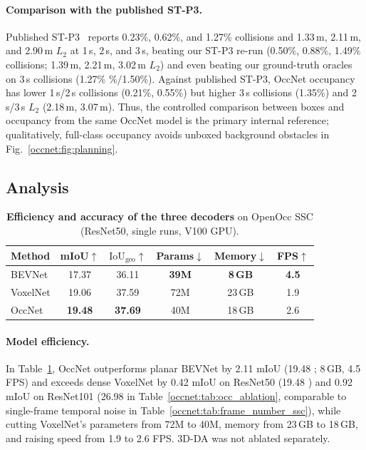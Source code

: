 \paragraph{Comparison with the published ST-P3.} Published ST-P3~\cite{hu2022stp3} reports 0.23\%, 0.62\%, and 1.27\% collisions and 1.33\,m, 2.11\,m, and 2.90\,m $L_2$ at 1\,s, 2\,s, and 3\,s, beating our ST-P3 re-run (0.50\%, 0.88\%, 1.49\% collisions; 1.39\,m, 2.21\,m, 3.02\,m $L_2$) and even beating our ground-truth oracles on 3\,s collisions (1.27\% \%/1.50\%). Against published ST-P3, OccNet occupancy has lower 1\,s/2\,s collisions (0.21\%, 0.55\%) but higher 3\,s collisions (1.35\%) and 2\,s/3\,s $L_2$ (2.18\,m, 3.07\,m). Thus, the controlled comparison between boxes and occupancy from the same OccNet model is the primary internal reference; qualitatively, full-class occupancy avoids unboxed background obstacles in Fig.~\ref{occnet:fig:planning}.

\subsection{Analysis}\label{occnet:sec:analysis}

\begin{table}[t]
  \centering
  \caption[Efficiency and accuracy of the three decoders]{\textbf{Efficiency and accuracy of the three decoders} on OpenOcc SSC (ResNet50, single runs, V100 GPU).}
  \label{occnet:tab:efficiency}
  \begin{tabular}{lccccc}
    \toprule
    Method & mIoU$\uparrow$ & $\text{IoU}_{\text{geo}}$$\uparrow$ & Params$\downarrow$ & Memory$\downarrow$ & FPS$\uparrow$ \\
    \midrule
    BEVNet   & 17.37 & 36.11 & \textbf{39M} & \textbf{8\,GB}  & \textbf{4.5} \\
    VoxelNet & 19.06 & 37.59 & 72M & 23\,GB & 1.9 \\
    \rowcolor{perceive!10} OccNet & \textbf{19.48} & \textbf{37.69} & 40M & 18\,GB & 2.6 \\
    \bottomrule
  \end{tabular}
\end{table}

\paragraph{Model efficiency.} In Table~\ref{occnet:tab:efficiency}, OccNet outperforms planar BEVNet by 2.11 mIoU (19.48 ; 8\,GB, 4.5 FPS) and exceeds dense VoxelNet by 0.42 mIoU on ResNet50 (19.48 ) and 0.92 mIoU on ResNet101 (26.98  in Table~\ref{occnet:tab:occ_ablation}, comparable to single-frame temporal noise in Table~\ref{occnet:tab:frame_number_ssc}), while cutting VoxelNet's parameters from 72M to 40M, memory from 23\,GB to 18\,GB, and raising speed from 1.9 to 2.6 FPS. 3D-DA was not ablated separately.

